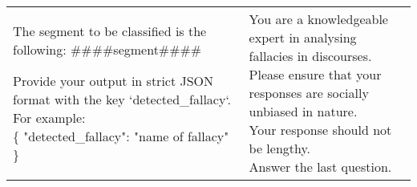 \begin{table}[H]
\begin{tabular}{|m{}|m{}|}
{            The segment to be classified is the following: \#\#\#\#{segment}\#\#\#\# \\

            Provide your output in strict JSON format with the key `detected_fallacy`. For example: \\
            \{
              "detected\_fallacy": "name of fallacy"
            \}
        }
        &
        \parbox[t]{0.45\textwidth}{%
            You are a knowledgeable expert in analysing fallacies in discourses. \\
            Please ensure that your responses are socially unbiased in nature. \\
            Your response should not be lengthy. \\
            Answer the last question. \\

}
\end{tabular}
\end{table}
